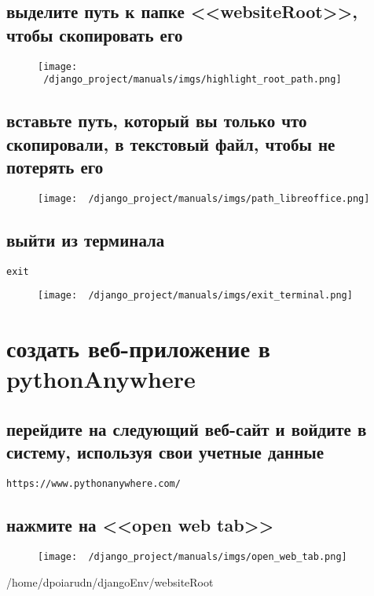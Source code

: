 \documentclass[12pt]{article}
\begin{document}
    \subsection{выделите путь к папке <<websiteRoot>>, чтобы скопировать его}
	\begin{figure}[H]
		\centering
		\texttt{[image: ~/django\_project/manuals/imgs/highlight\_root\_path.png]}
		\caption{}
	\end{figure}
  \subsection{вставьте путь, который вы только что скопировали, в текстовый файл, чтобы не потерять его}
	\begin{figure}[H]
		\centering
		\texttt{[image: ~/django\_project/manuals/imgs/path\_libreoffice.png]}
		\caption{}
	\end{figure}
    \subsection{ выйти из терминала}
			\begin{lstlisting}[caption=\phantom{},style=conlst,label={lst:enter_desktop}]
      exit
			\end{lstlisting}
	\begin{figure}[H]
		\centering
		\texttt{[image: ~/django\_project/manuals/imgs/exit\_terminal.png]}
		\caption{}
	\end{figure}
\section{создать веб-приложение в pythonAnywhere}
    \subsection{ перейдите на следующий веб-сайт и войдите в систему, используя свои учетные данные}
      \begin{lstlisting}[caption=\phantom{},style=conlst,label={lst:enter_desktop}]
      https://www.pythonanywhere.com/
			\end{lstlisting}
    \subsection{нажмите на <<open web tab>>}
	\begin{figure}[H]
		\centering
		\texttt{[image: ~/django\_project/manuals/imgs/open\_web\_tab.png]}
		\caption{}
	\end{figure}
  /home/dpoiarudn/djangoEnv/websiteRoot
\end{document}
